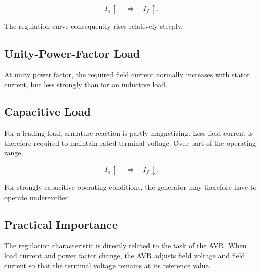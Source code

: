 \begin{equation}
  I_s\uparrow
  \quad\Longrightarrow\quad
  I_f\uparrow.
\end{equation}

The regulation curve consequently rises relatively steeply.

\subsection{Unity-Power-Factor Load}

At unity power factor, the required field current normally increases with
stator current, but less strongly than for an inductive load.

\subsection{Capacitive Load}

For a leading load, armature reaction is partly magnetizing. Less field current
is therefore required to maintain rated terminal voltage. Over part of the
operating range,

\begin{equation}
  I_s\uparrow
  \quad\Longrightarrow\quad
  I_f\downarrow.
\end{equation}

For strongly capacitive operating conditions, the generator may therefore
have to operate underexcited.

\subsection{Practical Importance}

The regulation characteristic is directly related to the task of the AVR.
When load current and power factor change, the AVR adjusts field voltage and
field current so that the terminal voltage remains at its reference value.

%

